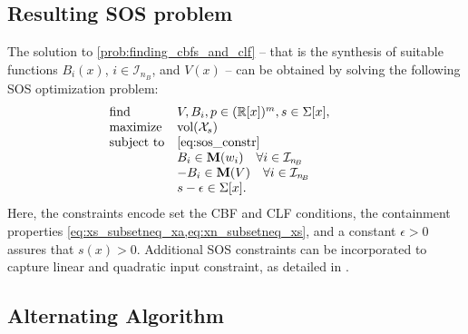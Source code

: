 \documentclass[lettersize,journal]{IEEEtran}
\newcommand{\R}{\mathbb{R}}
\newcommand{\afterReviewChangedBox}[1]{{\color{orange}#1}}
\begin{document}
\subsection{Resulting SOS problem}

The solution to \cref{prob:finding_cbfs_and_clf} -- that is the synthesis of suitable functions $B_i(x)$, $i \in \mathcal I_{n_{\!B}}$, and $V(x)$ -- can be obtained by solving the following SOS optimization problem:
\begin{align} \label{eq:sos_opt_prob}
   \hspace{-\leftmargin}
   \begin{array}{ll}
      \mbox{find} & V, B_i, p \in (\R[x])^m, s \in \Sigma[x], \\
      \mbox{maximize} & \text{vol}(\mathcal X_s) \\
      \mbox{subject to} & \text{\cref{eq:sos_constr}} \\
      & B_i \in \textbf M(w_i) \quad \forall i \in \mathcal I_{n_{\!B}} \\
      & -B_i \in \textbf M(V) \quad \forall i \in \mathcal I_{n_{\!B}} \\
      & s - \epsilon \in \Sigma[x]. \\
   \end{array}
\end{align}
Here, the constraints encode set the CBF and CLF conditions, the containment properties \cref{eq:xs_subsetneq_xa,eq:xn_subsetneq_xs}, and a constant $\epsilon > 0$ assures that $s(x) > 0$.
\afterReviewChangedBox{Additional SOS constraints can be incorporated to capture linear and quadratic input constraint, as detailed in \cite{schneeberger2024advanced}.}

\subsection{Alternating Algorithm}
\end{document}
